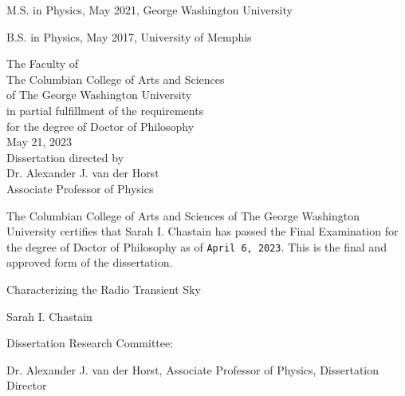 \documentclass[12pt]{article}
\begin{document}
\thispagestyle{empty}
\vspace*{1in}
\begin{center}
\centerline{M.S. in Physics, May 2021, George Washington University}
\centerline{B.S. in Physics, May 2017, University of Memphis}\vspace*{24pt}
\begin{center}
The Faculty of\\The Columbian College of Arts and Sciences \\ of The George
Washington University\\ in partial fulfillment of the requirements\\ for the degree
of Doctor of Philosophy\\[36pt]
May 21, 2023\\[36pt] %
Dissertation directed by\\[\baselineskip]
Dr. Alexander J. van der Horst\\
Associate Professor of Physics\\[\baselineskip]
\end{center}
\end{center}
\pagestyle{plain}
\setcounter{page}{1}
\newpage
\begin{doublespace}
\noindent
The Columbian College of Arts and Sciences of The George Washington University certifies that Sarah I. Chastain has passed the Final Examination for the degree of Doctor of Philosophy as of \texttt{April 6, 2023}. This is the final and approved form of the dissertation.
\end{doublespace}
\vspace{12pt}
\begin{center}
Characterizing the Radio Transient Sky

\vspace*{36pt}
Sarah I. Chastain
\vspace{24pt}
\end{center}
Dissertation Research Committee:
\vspace{12pt}

\indent Dr. Alexander J. van der Horst, Associate Professor of Physics, Dissertation Director
\vspace{12pt}
\end{document}
